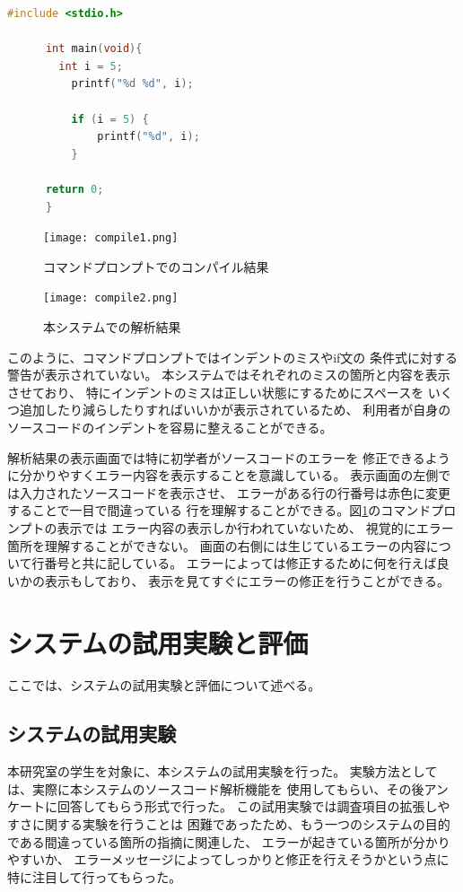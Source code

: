 \documentclass{csspaper}
\begin{document}
      \begin{lstlisting}[language=c]
      #include <stdio.h>
      
      int main(void){
        int i = 5;
          printf("%d %d", i);
      
          if (i = 5) {
              printf("%d", i);
          }
      
      return 0;
      }

      \end{lstlisting}

      \begin{figure}[p]
         \centering
         \texttt{[image: compile1.png]}
         \caption{コマンドプロンプトでのコンパイル結果}
         \label{fig:sys3}
      \end{figure}

      \begin{figure}[p]
         \centering
         \texttt{[image: compile2.png]}
         \caption{本システムでの解析結果}
         \label{fig:sys4}
      \end{figure}

      このように、コマンドプロンプトではインデントのミスやif文の
      条件式に対する警告が表示されていない。
      本システムではそれぞれのミスの箇所と内容を表示させており、
      特にインデントのミスは正しい状態にするためにスペースを
      いくつ追加したり減らしたりすればいいかが表示されているため、
      利用者が自身のソースコードのインデントを容易に整えることができる。

      解析結果の表示画面では特に初学者がソースコードのエラーを
      修正できるように分かりやすくエラー内容を表示することを意識している。
      表示画面の左側では入力されたソースコードを表示させ、
      エラーがある行の行番号は赤色に変更することで一目で間違っている
      行を理解することができる。図\ref{fig:sys3}のコマンドプロンプトの表示では
      エラー内容の表示しか行われていないため、
      視覚的にエラー箇所を理解することができない。
      画面の右側には生じているエラーの内容について行番号と共に記している。
      エラーによっては修正するために何を行えば良いかの表示もしており、
      表示を見てすぐにエラーの修正を行うことができる。

   \chapter{システムの試用実験と評価}
   ここでは、システムの試用実験と評価について述べる。

      \section{システムの試用実験}
      本研究室の学生を対象に、本システムの試用実験を行った。
      実験方法としては、実際に本システムのソースコード解析機能を
      使用してもらい、その後アンケートに回答してもらう形式で行った。
      この試用実験では調査項目の拡張しやすさに関する実験を行うことは
      困難であったため、もう一つのシステムの目的である間違っている箇所の指摘に関連した、
      エラーが起きている箇所が分かりやすいか、
      エラーメッセージによってしっかりと修正を行えそうかという点に
      特に注目して行ってもらった。
\end{document}
